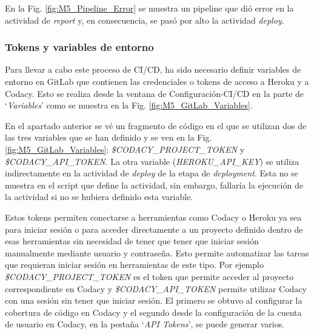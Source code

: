  
 En la Fig. \ref{fig:M5_Pipeline_Error} se muestra un pipeline que dió error en la actividad de \textit{report} y, en consecuencia, se pasó por alto la actividad \textit{deploy}.
 

\subsubsection{Tokens y variables de entorno}

Para llevar a cabo este proceso de CI/CD, ha sido necesario definir variables de entorno en GitLab que contienen las credenciales o tokens de acceso a Heroku y a Codacy. Esto se realiza desde la ventana de Configuración-CI/CD en la parte de `\textit{Variables}' como se muestra en la Fig. \ref{fig:M5_GitLab_Variables}.


En el apartado anterior se vé un fragmento de código en el que se utilizan dos de las tres variables que se han definido y se ven en la Fig. \ref{fig:M5_GitLab_Variables}: \textit{\$CODACY\_PROJECT\_TOKEN} y \textit{\$CODACY\_API\_TOKEN}. La otra variable (\textit{HEROKU\_API\_KEY}) se utiliza indirectamente en la actividad de \textit{deploy} de la etapa de \textit{deployment}. Esta no se muestra en el script que define la actividad, sin embargo, fallaría la ejecución de la actividad si no se hubiera definido esta variable.

Estos tokens permiten conectarse a herramientas como Codacy o Heroku ya sea para iniciar sesión o para acceder directamente a un proyecto definido dentro de esas herramientas sin necesidad de tener que tener que iniciar sesión manualmente mediante usuario y contraseña. Esto permite automatizar las tareas que requieran iniciar sesión en herramientas de este tipo. Por ejemplo \textit{\$CODACY\_PROJECT\_TOKEN} es el token que permite acceder al proyecto correspondiente en Codacy y \textit{\$CODACY\_API\_TOKEN} permite utilizar Codacy con una sesión sin tener que iniciar sesión. El primero se obtuvo al configurar la cobertura de código en Codacy y el segundo desde la configuración de la cuenta de usuario en Codacy, en la pestaña `\textit{API Tokens}', se puede generar varios.

